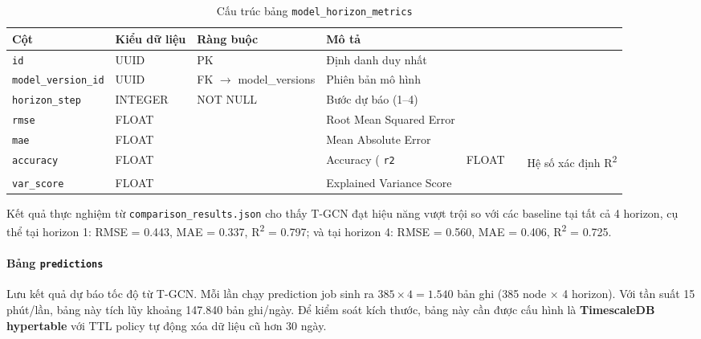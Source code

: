 \begin{table}[H]
\centering
\caption{Cấu trúc bảng \texttt{model\_horizon\_metrics}}
\begin{tabular}{|l|l|l|p{5cm}|}
\hline
\textbf{Cột} & \textbf{Kiểu dữ liệu} & \textbf{Ràng buộc} & \textbf{Mô tả} \\
\hline
\texttt{id} & UUID & PK & Định danh duy nhất \\
\texttt{model\_version\_id} & UUID & FK $\to$ model\_versions & Phiên bản mô hình \\
\texttt{horizon\_step} & INTEGER & NOT NULL & Bước dự báo (1--4) \\
\texttt{rmse} & FLOAT & & Root Mean Squared Error \\
\texttt{mae} & FLOAT & & Mean Absolute Error \\
\texttt{accuracy} & FLOAT & & Accuracy (%
\texttt{r2} & FLOAT & & Hệ số xác định R\textsuperscript{2} \\
\texttt{var\_score} & FLOAT & & Explained Variance Score \\
\hline
\end{tabular}
\end{table}

Kết quả thực nghiệm từ \texttt{comparison\_results.json} cho thấy T-GCN đạt hiệu năng vượt trội so với các baseline tại tất cả 4 horizon, cụ thể tại horizon 1: RMSE = 0.443, MAE = 0.337, R\textsuperscript{2} = 0.797; và tại horizon 4: RMSE = 0.560, MAE = 0.406, R\textsuperscript{2} = 0.725.

\paragraph{Bảng \texttt{predictions}}
Lưu kết quả dự báo tốc độ từ T-GCN. Mỗi lần chạy prediction job sinh ra $385 \times 4 = 1.540$ bản ghi (385 node × 4 horizon). Với tần suất 15 phút/lần, bảng này tích lũy khoảng 147.840 bản ghi/ngày. Để kiểm soát kích thước, bảng này cần được cấu hình là \textbf{TimescaleDB hypertable} với TTL policy tự động xóa dữ liệu cũ hơn 30 ngày.


